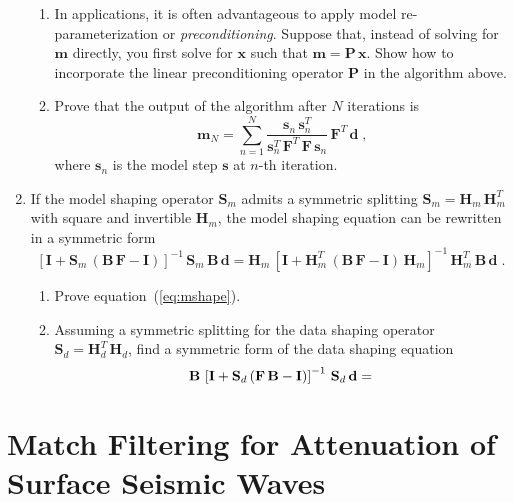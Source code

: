\begin{enumerate}
\begin{enumerate}
\item  In applications, it is often advantageous to apply model
    re-parameterization or \emph{preconditioning}. Suppose that,
  instead of solving for $\mathbf{m}$ directly, you first solve for
  $\mathbf{x}$ such that $\mathbf{m} = \mathbf{P}\,\mathbf{x}$. Show
  how to incorporate the linear preconditioning operator $\mathbf{P}$
  in the algorithm above.
\item Prove that the output of the algorithm after $N$ iterations is
\begin{equation}
\label{eq:msol}
\mathbf{m}_N = \sum\limits_{n=1}^{N} \frac{\mathbf{s}_n\,\mathbf{s}_n^T}{\mathbf{s}_n^T\,\mathbf{F}^T\,\mathbf{F}\,\mathbf{s}_n}\,\mathbf{F}^T\,\mathbf{d}\;,
\end{equation}
where $\mathbf{s}_n$ is the model step $\mathbf{s}$ at $n$-th iteration.

\end{enumerate}

\item If the model shaping operator $\mathbf{S}_m$ admits a
symmetric splitting $\mathbf{S}_m=\mathbf{H}_m\,\mathbf{H}_m^T$ with square and invertible
$\mathbf{H}_m$, the model shaping equation can be rewritten in a symmetric form
\begin{equation}
\label{eq:mshape}
\left[\mathbf{I} + \mathbf{S}_m\,(\mathbf{B\,F - I})\right]^{-1}\,\mathbf{S}_m\,\mathbf{B\,d} 
= \mathbf{H}_m\,\left[\mathbf{I} + \mathbf{H}_m^T\,(\mathbf{B\,F - I})\,\mathbf{H}_m\right]^{-1}\,\mathbf{H}_m^T\,\mathbf{B\,d}\;.
\end{equation}
\begin{enumerate}
\item Prove equation~(\ref{eq:mshape}).
\item Assuming a symmetric splitting for the data shaping operator $\mathbf{S}_d=\mathbf{H}_d^T\,\mathbf{H}_d$, find a symmetric form of the data shaping equation
\begin{equation}
\label{eq:dshape}
\mathbf{B}\,\left[\mathbf{I} + \mathbf{S}_d\,(\mathbf{F\,B - I})\right]^{-1}\, \mathbf{S}_d\,\mathbf{d} = \hfill \ 
\end{equation}
\end{enumerate}

\end{enumerate}

\section{Match Filtering for Attenuation of Surface Seismic Waves}
\inputdir{match}


